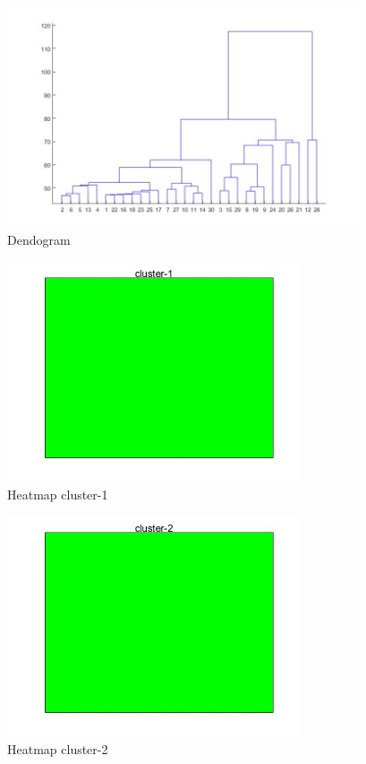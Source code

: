 \begin{figure}[htbp]
	\centering
	\includegraphics[height=6.5cm]{analisis/dendogram.jpg}
	\caption{Dendogram}
	\label{pic:dendo}
\end{figure}

\begin{figure}[htbp]
	\centering
	\includegraphics[height=6.5cm]{analisis/cluster-1.jpg}
	\caption{Heatmap cluster-1}
	\label{pic:cluster-1}
\end{figure}

\begin{figure}[htbp]
	\centering
	\includegraphics[height=6.5cm]{analisis/cluster-2.jpg}
	\caption{Heatmap cluster-2}
	\label{pic:cluster-2}
\end{figure}

